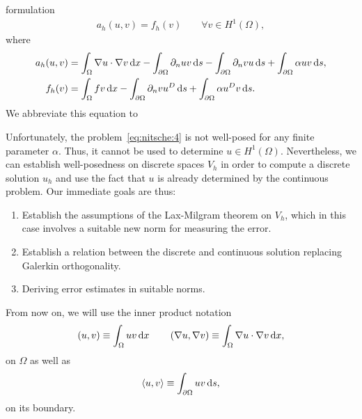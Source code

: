 \begin{intro}
  formulation
  \begin{gather}
    \label{eq:nitsche:5}
    a_h(u,v) = f_h(v) \qquad\forall v\in H^1(\Omega),
  \end{gather}
  where
  \begin{gather}
    \label{eq:nitsche:4}
    \begin{split}
    a_h(u,v) &= \int_\Omega \nabla u \cdot \nabla v \,\mathrm{d} x
    -\int_{\partial\Omega} \partial_n u v \,\mathrm{d} s
    -\int_{\partial\Omega} \partial_n v u \,\mathrm{d} s
    + \int_{\partial\Omega} \alpha u v \,\mathrm{d} s,
    \\
    f_h(v) &= \int_\Omega fv\,\mathrm{d} x
    -\int_{\partial\Omega} \partial_n v u^D \,\mathrm{d} s
    + \int_{\partial\Omega} \alpha u^D v \,\mathrm{d} s.
  \end{split}
\end{gather}
  We abbreviate this equation to
\end{intro}

\begin{note}
  Unfortunately, the problem~\eqref{eq:nitsche:4} is not well-posed
  for any finite parameter $\alpha$. Thus, it cannot be used to
  determine $u\in H^1(\Omega)$. Nevertheless, we can establish
  well-posedness on discrete spaces $V_h$ in order to compute a
  discrete solution $u_h$ and use the fact that $u$ is already
  determined by the continuous problem. Our immediate goals are thus:
  \begin{enumerate}
  \item Establish the assumptions of the Lax-Milgram theorem on $V_h$,
    which in this case involves a suitable new norm for measuring the
    error.
  \item Establish a relation between the discrete and continuous
    solution replacing Galerkin orthogonality.
  \item Deriving error estimates in suitable norms.
  \end{enumerate}
\end{note}

\begin{notation}
  From now on, we will use the inner product notation
  \begin{gather*}
    \form(u,v) \equiv \int_\Omega uv\dx
    \qquad
    \form(\nabla u,\nabla v) \equiv \int_\Omega \nabla u\cdot\nabla v\dx,
  \end{gather*}
  on $\Omega$ as well as
  \begin{gather*}
    \forme(u,v) \equiv \int_{\partial\Omega} uv\ds,
  \end{gather*}
  on its boundary.
\end{notation}

